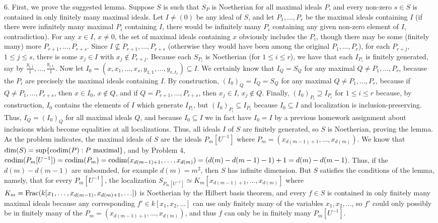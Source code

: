 \documentclass[11pt]{article}
\begin{document}
\num{6.} First, we prove the suggested lemma. Suppose $S$ is such that $S_P$ is Noetherian for all maximal ideals $P$, and every non-zero $s\in S$ is contained in only finitely many maximal ideals. Let $I\neq(0)$ be any ideal of $S$, and let $P_1,\ldots,P_r$ be the maximal ideals containing $I$ (if there were infinitely many maximal $P_i$ containing $I$, there would be infinitely many $P_i$ containing any given non-zero element of $I$, contradiction). For any $x\in I$, $x\neq0$, the set of maximal ideals containing $x$ obviously includes the $P_i$, though there may be some (finitely many) more $P_{r+1},\ldots,P_{r+s}$. Since $I\not\subseteq P_{r+1},\ldots,P_{r+s}$ (otherwise they would have been among the original $P_1,\ldots,P_r$), for each $P_{r+j}$, $1\leq j\leq s$, there is some $x_j\in I$ with $x_j\notin P_{r+j}$. Because each $S_{P_i}$ is Noetherian (for $1\leq i\leq r$), we have that each $I_{P_i}$ is finitely generated, say by $\frac{y_{i,1}}{1},\ldots,\frac{y_{i,t_i}}{1}$. Now let $I_0=(x,x_1,\ldots,x_s,y_{1,1},\ldots,y_{r,t_r})\subseteq I$. We certainly know that $I_Q=S_Q$ for any maximal $Q\neq P_1,\ldots,P_r$, because the $P_i$ are precisely the maximal ideals containing $I$. By construction, $(I_0)_Q=I_Q=S_Q$ for any maximal $Q\neq P_1,\ldots,P_r$, because if $Q\neq P_1,\ldots,P_{r+s}$, then $x\in I_0$, $x\notin Q$, and if $Q=P_{r+1},\ldots,P_{r+s}$, then $x_j\in I$, $x_j\notin Q$. Finally, $(I_0)_{P_i}\supseteq I_{P_i}$ for $1\leq i\leq r$ because, by construction, $I_0$ contains the elements of $I$ which generate $I_{P_i}$, but $(I_0)_{P_i}\subseteq I_{P_i}$ because $I_0\subseteq I$ and localization is inclusion-preserving. Thus, $I_Q=(I_0)_Q$ for all maximal ideals $Q$, and because $I_0\subseteq I$ we in fact have $I_0=I$ by a previous homework assignment about inclusions which become equalities at all localizations. Thus, all ideals $I$ of $S$ are finitely generated, so $S$ is Noetherian, proving the lemma.\\

As the problem indicates, the maximal ideals of $S$ are the ideals $P_m[U^{-1}]$ where $P_m=(x_{d(m-1)+1},\ldots,x_{d(m)})$. We know that $\operatorname{dim}(S)=\sup\{\operatorname{codim}(P):P\text{ maximal}\}$, and by Problem 4, $\operatorname{codim}(P_m[U^{-1}])=\operatorname{codim}(P_m)=\operatorname{codim}(x_{d(m-1)+1},\ldots,x_{d(m)})=(d(m)-d(m-1)-1)+1=d(m)-d(m-1)$. Thus, if the $d(m)-d(m-1)$ are unbounded, for example $d(m)=m^2$, then $S$ has infinite dimension. But $S$ satisfies the conditions of the lemma, namely, that for every $P_m[U^{-1}]$, the localization $S_{P_m[U^{-1}]}\simeq K_m[x_{d(m-1)+1},\ldots,x_{d(m)}]$ where $K_m=\operatorname{Frac}(k[x_1,\ldots,x_{d(m-1)},x_{d(m)+1},\ldots])$ is Noetherian by the Hilbert basis theorem, and every $f\in S$ is contained in only finitely many maximal ideals because any corresponding $f'\in k[x_1,x_2,\ldots]$ can use only finitely many of the variables $x_1,x_2,\ldots$, so $f'$ could only possibly be in finitely many of the $P_m=(x_{d(m-1)+1},\ldots,x_{d(m)})$, and thus $f$ can only be in finitely many $P_m[U^{-1}]$.    \\
\end{document}
